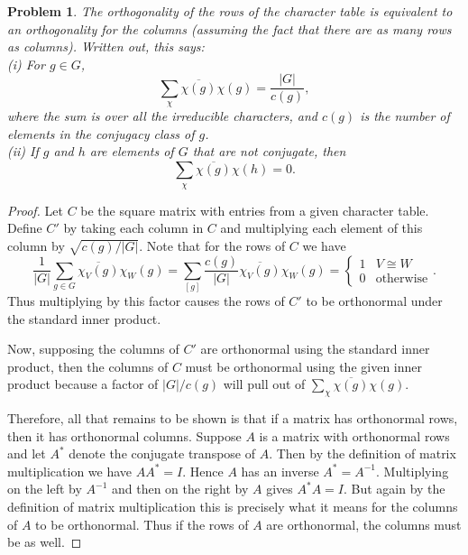 \documentclass{article}
\newtheorem{problem}{Problem}
\begin{document}
\begin{problem}
The orthogonality of the rows of the character table is equivalent to an orthogonality for the columns (assuming the fact that there are as many rows as columns). Written out, this says:\\
(i) For $g \in G$,
\[
\sum_{\chi} \overline{\chi(g)} \chi(g) = \frac{|G|}{c(g)},
\]
where the sum is over all the irreducible characters, and $c(g)$ is the number of elements in the conjugacy class of $g$.\\
(ii) If $g$ and $h$ are elements of $G$ that are not conjugate, then
\[
\sum_{\chi} \overline{\chi(g)} \chi(h) = 0.
\]
\end{problem}
\begin{proof}
Let $C$ be the square matrix with entries from a given character table. Define $C'$ by taking each column in $C$ and multiplying each element of this column by $\sqrt{c(g)/|G|}$. Note that for the rows of $C$ we have
\[
\frac{1}{|G|}\sum_{g \in G} \overline{\chi_V(g)} \chi_W(g) = \sum_{[g]} \frac{c(g)}{|G|} \overline{\chi_V(g)}\chi_W(g) = \begin{cases} 1 & V \cong W\\ 0 & \text{otherwise} \end{cases}.
\]
Thus multiplying by this factor causes the rows of $C'$ to be orthonormal under the standard inner product.

Now, supposing the columns of $C'$ are orthonormal using the standard inner product, then the columns of $C$ must be orthonormal using the given inner product because a factor of $|G|/c(g)$ will pull out of $\sum_{\chi} \overline{\chi(g)}\chi(g)$.

Therefore, all that remains to be shown is that if a matrix has orthonormal rows, then it has orthonormal columns. Suppose $A$ is a matrix with orthonormal rows and let $A^*$ denote the conjugate transpose of $A$. Then by the definition of matrix multiplication we have $A A^* = I$. Hence $A$ has an inverse $A^* = A^{-1}$. Multiplying on the left by $A^{-1}$ and then on the right by $A$ gives $A^* A = I$. But again by the definition of matrix multiplication this is precisely what it means for the columns of $A$ to be orthonormal. Thus if the rows of $A$ are orthonormal, the columns must be as well.
\end{proof}
\end{document}
